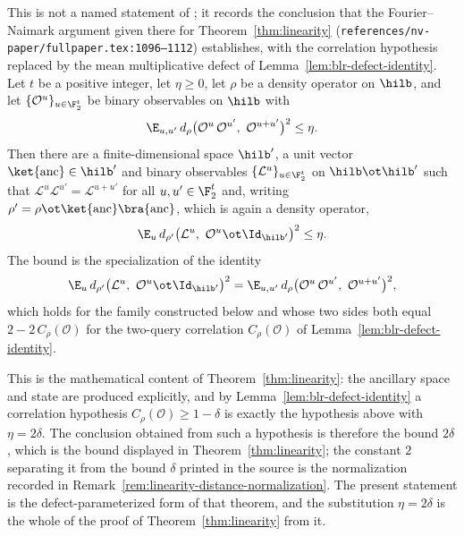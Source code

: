 \begin{lemma}
	\label{lem:boolean-representation-stability}
	\leanok
	This is not a named statement of \cite{Natarajan2017Linearity}; it records
	the conclusion that the Fourier--Naimark argument given there for
	Theorem~\ref{thm:linearity}
	(\texttt{references/nv-paper/fullpaper.tex:1096--1112}) establishes, with
	the correlation hypothesis replaced by the mean multiplicative defect of
	Lemma~\ref{lem:blr-defect-identity}. Let $t$ be a positive integer, let
	$\eta \ge 0$, let $\rho$ be a density operator on $\hilb$, and let
	$\{\mathcal{O}^u\}_{u \in \F_2^t}$ be binary observables on $\hilb$ with
	\[
		\E_{u,u'} \, d_\rho\big(\mathcal{O}^u \, \mathcal{O}^{u'},\
		\mathcal{O}^{u+u'}\big)^2 \le \eta .
	\]
	Then there are a finite-dimensional space $\hilb'$, a unit vector
	$\ket{\mathrm{anc}} \in \hilb'$ and binary observables
	$\{\mathcal{L}^u\}_{u \in \F_2^t}$ on $\hilb \ot \hilb'$ such that
	$\mathcal{L}^u \mathcal{L}^{u'} = \mathcal{L}^{u+u'}$ for all
	$u, u' \in \F_2^t$ and, writing
	$\rho' = \rho \ot \ket{\mathrm{anc}}\bra{\mathrm{anc}}$, which is again a
	density operator,
	\[
		\E_u \, d_{\rho'}\big(\mathcal{L}^u,\ \mathcal{O}^u \ot
		\Id_{\hilb'}\big)^2 \le \eta .
	\]
	The bound is the specialization of the identity
	\[
		\E_u \, d_{\rho'}\big(\mathcal{L}^u,\ \mathcal{O}^u \ot
		\Id_{\hilb'}\big)^2
		= \E_{u,u'} \, d_\rho\big(\mathcal{O}^u \, \mathcal{O}^{u'},\
		\mathcal{O}^{u+u'}\big)^2 ,
	\]
	which holds for the family constructed below and whose two sides both
	equal $2 - 2 \, C_\rho(\mathcal{O})$ for the two-query correlation
	$C_\rho(\mathcal{O})$ of Lemma~\ref{lem:blr-defect-identity}.

	This is the mathematical content of Theorem~\ref{thm:linearity}: the
	ancillary space and state are produced explicitly, and by
	Lemma~\ref{lem:blr-defect-identity} a correlation hypothesis
	$C_\rho(\mathcal{O}) \ge 1 - \delta$ is exactly the hypothesis above with
	$\eta = 2\delta$. The conclusion obtained from such a hypothesis is
	therefore the bound $2\delta$, which is the bound displayed in
	Theorem~\ref{thm:linearity}; the constant $2$ separating it from the bound
	$\delta$ printed in the source is the normalization recorded in
	Remark~\ref{rem:linearity-distance-normalization}. The present statement is
	the defect-parameterized form of that theorem, and the substitution
	$\eta = 2\delta$ is the whole of the proof of
	Theorem~\ref{thm:linearity} from it.
\end{lemma}
